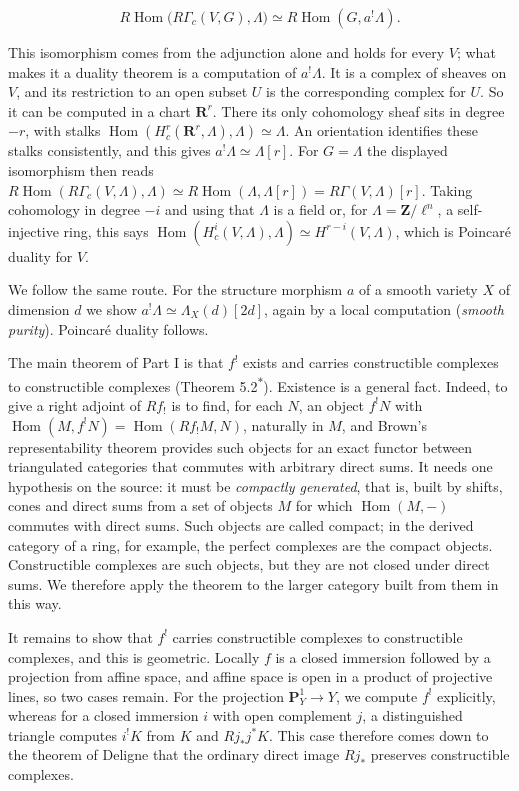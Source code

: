 \documentclass[11pt]{article}
\newcommand{\bpout}[1]{#1\textsuperscript{\hyperlink{bp-outside}{\ensuremath{\ast}}}}
\providecommand{\Hom}{}\renewcommand{\Hom}{\operatorname{Hom}}
\begin{document}
\[
R\!\operatorname{Hom}\bigl(R\Gamma_c(V,G),\Lambda\bigr)\simeq R\!\operatorname{Hom}(G,a^!\Lambda).
\]

This isomorphism comes from the adjunction alone and holds for every \(V\); what makes it a duality theorem is a computation of \(a^!\Lambda\). It is a complex of sheaves on \(V\), and its restriction to an open subset \(U\) is the corresponding complex for \(U\). So it can be computed in a chart \(\mathbf R^r\). There its only cohomology sheaf sits in degree \(-r\), with stalks \(\Hom(H^r_c(\mathbf R^r,\Lambda),\Lambda)\simeq\Lambda\). An orientation identifies these stalks consistently, and this gives \(a^!\Lambda\simeq\Lambda[r]\). For \(G=\Lambda\) the displayed isomorphism then reads \(R\!\operatorname{Hom}(R\Gamma_c(V,\Lambda),\Lambda)\simeq R\!\operatorname{Hom}(\Lambda,\Lambda[r])=R\Gamma(V,\Lambda)[r]\). Taking cohomology in degree \(-i\) and using that \(\Lambda\) is a field or, for \(\Lambda=\mathbf Z/\ell^n\), a self-injective ring, this says \(\Hom(H^i_c(V,\Lambda),\Lambda)\simeq H^{r-i}(V,\Lambda)\), which is Poincaré duality for \(V\).

We follow the same route. For the structure morphism \(a\) of a smooth variety \(X\) of dimension \(d\) we show \(a^!\Lambda\simeq\Lambda_X(d)[2d]\), again by a local computation (\emph{smooth purity}). Poincaré duality follows.

The main theorem of Part I is that \(f^!\) exists and carries constructible complexes to constructible complexes (Theorem \bpout{5.2}). Existence is a general fact. Indeed, to give a right adjoint of \(Rf_!\) is to find, for each \(N\), an object \(f^!N\) with \(\Hom(M,f^!N)=\Hom(Rf_!M,N)\), naturally in \(M\), and Brown's representability theorem provides such objects for an exact functor between triangulated categories that commutes with arbitrary direct sums. It needs one hypothesis on the source: it must be \emph{compactly generated}, that is, built by shifts, cones and direct sums from a set of objects \(M\) for which \(\Hom(M,-)\) commutes with direct sums. Such objects are called compact; in the derived category of a ring, for example, the perfect complexes are the compact objects. Constructible complexes are such objects, but they are not closed under direct sums. We therefore apply the theorem to the larger category built from them in this way.

It remains to show that \(f^!\) carries constructible complexes to constructible complexes, and this is geometric. Locally \(f\) is a closed immersion followed by a projection from affine space, and affine space is open in a product of projective lines, so two cases remain. For the projection \(\mathbf P^1_Y\to Y\), we compute \(f^!\) explicitly, whereas for a closed immersion \(i\) with open complement \(j\), a distinguished triangle computes \(i^!K\) from \(K\) and \(Rj_*j^*K\). This case therefore comes down to the theorem of Deligne that the ordinary direct image \(Rj_*\) preserves constructible complexes.
\end{document}
